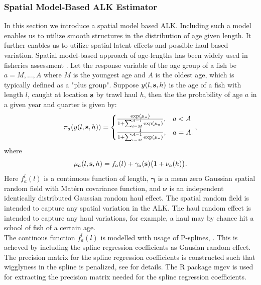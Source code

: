 \documentclass[a4paper 12pt]{article}
\numberwithin{equation}{section}
\begin{document}
\subsubsection{Spatial Model-Based ALK Estimator}
\label{sec:spatialModelALK}
In this section we introduce a spatial model based ALK. Including such a model enables us to utilize smooth structures in the distribution of age given length. It further enables us to utilize spatial latent effects and possible haul based variation. Spatial model-based approach of age-lengths has been widely used in fisheries assessment \citep{berg2012spatial, kvist2000using, rindorf2001analyses}. %
\indent Let the response variable of the age group of a fish be $a = M,...,A$ where $M$ is the youngest age and $A$ is the oldest age, which is typically defined as a "plus group". Suppose $y(l,{\bf s},h)$ is the age  of a fish with length $l$, caught at location ${\bf s}$ by trawl haul $h$, then the the probability of age $a$ in a given year and quarter is given by:
\begin{align}
\pi_a(y(l,{\bf s},h)) =
\begin{cases}
\frac{\exp(\mu_a)}{1+ \sum_{i = M}^{A-1} \exp(\mu_a)} ,& a<A \\
\frac{1}{1+ \sum_{i = M}^{A-1} \exp(\mu_a)},& a=A.
\end{cases},
\label{model}
\end{align}
where 
\begin{align}\label{eq:linearPred}
\mu_a(l,{\bf s},h) = f_a(l)  + \gamma_a({\bf s}) \big(1+ \nu_a(h)\big).
\end{align}
Here $ f_a^l(l)$ is a continuous function of length, $\pmb{\gamma}$ is a mean zero Gaussian spatial random field with Mat\'{e}rn covariance function, and $\pmb{\nu}$ is an independent identically distributed Gaussian random haul effect. The spatial random field is intended to capture any spatial variation in the ALK. The haul random effect is intended to capture any haul variations, for example, a haul may by chance hit a school of fish of a certain age.\\  
\indent The continous function $f_a^l(l)$ is modelled with usage of P-splines, \citep{wood2017generalized}. This is acheved by including the spline regression coefficients as Gausian random effect. The precision matrix for the spline regression coefficients is constructed such that wigglyness in the spline is penalized, see \citet[page 239]{wood2017generalized} for details. The R package mgcv \citep{wood2015package} is used for extracting the precision matrix needed for the spline regression coefficients.
\end{document}
